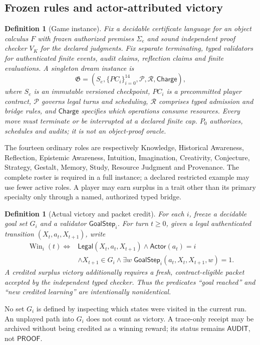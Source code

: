 \documentclass[11pt,letterpaper]{article}
\newtheorem{definition}[theorem]{Definition}
\newcommand{\Pk}{\mathsf{PROOF}}
\newcommand{\Au}{\mathsf{AUDIT}}
\newcommand{\Win}{\operatorname{Win}}
\newcommand{\Sigmae}{\Sigma_e}
\begin{document}
\subsection{Frozen rules and actor-attributed victory}
\begin{definition}[Game instance]
Fix a decidable certificate language for an object calculus $F$ with frozen authorized premises $\Sigmae$ and sound independent proof checker $V_K$ for the declared judgments. Fix separate terminating, typed validators for authenticated finite events, audit claims, reflection claims and finite evaluations. A \emph{singleton dream instance} is
\[
\mathfrak G=(S_e,\{PC_i\}_{i=0}^{14},\mathcal{P},\mathcal{R},\mathsf{Charge}),
\]
where $S_e$ is an immutable versioned checkpoint, $PC_i$ is a precommitted player contract, $\mathcal P$ governs legal turns and scheduling, $\mathcal R$ comprises typed admission and bridge rules, and $\mathsf{Charge}$ specifies which operations consume resources. Every move must terminate or be interrupted at a declared finite cap. $P_0$ authorizes, schedules and audits; it is not an object-proof oracle.
\end{definition}
The fourteen ordinary roles are respectively Knowledge, Historical Awareness, Reflection, Epistemic Awareness, Intuition, Imagination, Creativity, Conjecture, Strategy, Gestalt, Memory, Study, Resource Judgment and Provenance. The complete roster is required in a full instance; a declared restricted example may use fewer active roles. A player may earn surplus in a trait other than its primary specialty only through a named, authorized typed bridge.

\begin{definition}[Actual victory and packet credit]
For each $i$, freeze a decidable goal set $G_i$ and a validator $\mathsf{GoalStep}_i$. For turn $t\geq0$, given a legal authenticated transition $(X_t,a_t,X_{t+1})$, write
\begin{align}
\Win_i(t) \iff{}& \mathsf{Legal}(X_t,a_t,X_{t+1})\land\mathsf{Actor}(a_t)=i\\[-2pt]
&\land X_{t+1}\in G_i\land \exists w\;\mathsf{GoalStep}_i(a_t,X_t,X_{t+1},w)=1.\nonumber
\end{align}
A \emph{credited surplus victory} additionally requires a fresh, contract-eligible packet accepted by the independent typed checker. Thus the predicates ``goal reached'' and ``new credited learning'' are intentionally nonidentical.
\end{definition}
No set $G_i$ is defined by inspecting which states were visited in the current run. An unplayed path into $G_i$ does not count as victory. A trace-only receipt may be archived without being credited as a winning reward; its status remains $\Au$, not $\Pk$.
\end{document}
